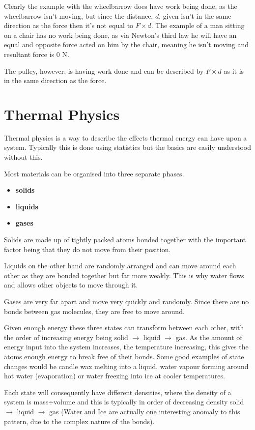 \documentclass[11pt, titlepage]{article}
\begin{document}
Clearly the example with the wheelbarrow does have work being done, as the wheelbarrow isn't moving, but since the distance, $d$, given isn't in the same direction as the force then it's not equal to $F \times d$.  The example of a man sitting on a chair has no work being done, as via Newton's third law he will have an equal and opposite force acted on him by the chair, meaning he isn't moving and resultant force is 0 N.

The pulley, however, is having work done and can be described by $F \times d$ as it is in the same direction as the force.

\section{Thermal Physics}
Thermal physics is a way to describe the effects thermal energy can have upon a system.  Typically this is done using statistics but the basics are easily understood without this.

Most materials can be organised into three separate phases.
\begin{itemize}
\item \textbf{solids}
\item \textbf{liquids}
\item \textbf{gases}
\end{itemize}

Solids are made up of tightly packed atoms bonded together with the important factor being that they do not move from their position.

Liquids on the other hand are randomly arranged and can move around each other as they are bonded together but far more weakly.  This is why water flows and allows other objects to move through it.

Gases are very far apart and move very quickly and randomly.  Since there are no bonds between gas molecules, they are free to move around.

Given enough energy these three states can transform between each other, with the order of increasing energy being solid $\rightarrow$ liquid $\rightarrow$ gas.  As the amount of energy input into the system increases, the temperature increasing, this gives the atoms enough energy to break free of their bonds.  Some good examples of state changes would be candle wax melting into a liquid, water vapour forming around hot water (evaporation) or water freezing into ice at cooler temperatures.

Each state will consequently have different densities, where the density of a system is mass$\div$volume and this is typically in order of decreasing density solid $\rightarrow$ liquid $\rightarrow$ gas (Water and Ice are actually one interesting anomaly to this pattern, due to the complex nature of the bonds).
\end{document}
